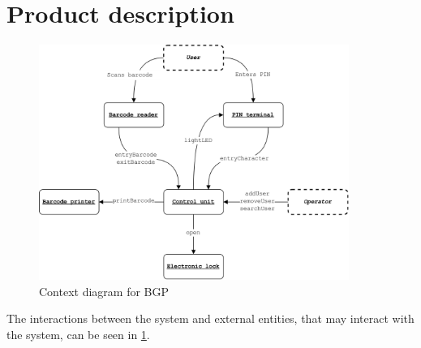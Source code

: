 \documentclass[12pt,titlepage]{article}
\begin{document}
\section{Product description}
\begin{figure}
	\centering
	\includegraphics[width=0.9\textwidth]{./assets/context-hw.png}
	\caption{Context diagram for BGP}
	\label{fig:context-hw}
\end{figure}

The interactions between the system and external entities, that may interact with the system, can be seen in \cref{fig:context-hw}.
{}


\end{document}
